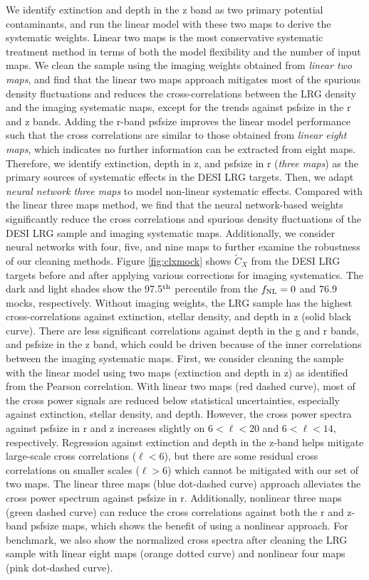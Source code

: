 We identify extinction and depth in the z band as two primary potential contaminants, and run the linear model with these two maps to derive the systematic weights. Linear two maps is the most conservative systematic treatment method in terms of both the model flexibility and the number of input maps. We clean the sample using the imaging weights obtained from \textit{linear two maps}, and find that the linear two maps approach mitigates most of the spurious density fluctuations and reduces the cross-correlations between the LRG density and the imaging systematic maps, except for the trends against psfsize in the r and z bands. Adding the r-band psfsize improves the linear model performance such that the cross correlations are similar to those obtained from \textit{linear eight maps}, which indicates no further information can be extracted from eight maps. Therefore, we identify extinction, depth in z, and psfsize in r (\textit{three maps}) as the primary sources of systematic effects in the DESI LRG targets. Then, we adapt \textit{neural network three maps} to model non-linear systematic effects. Compared with the linear three maps method, we find that the neural network-based weights significantly reduce the cross correlations and spurious density fluctuations of the DESI LRG sample and imaging systematic maps. Additionally, we consider neural networks with four, five, and nine maps to further examine the robustness of our cleaning methods. Figure \ref{fig:clxmock} shows $\tilde{C}_{X}$ from the DESI LRG targets before and after applying various corrections for imaging systematics. The dark and light shades show the 97.5$^{\rm th}$ percentile from the $f_{\rm NL}=0$ and $76.9$ mocks, respectively. Without imaging weights, the LRG sample has the highest cross-correlations against extinction, stellar density, and depth in z (solid black curve). There are less significant correlations against depth in the g and r bands, and psfsize in the z band, which could be driven because of the inner correlations between the imaging systematic maps. First, we consider cleaning the sample with the linear model using two maps (extinction and depth in z) as identified from the Pearson correlation. With linear two maps (red dashed curve), most of the cross power signals are reduced below statistical uncertainties, especially against extinction, stellar density, and depth. However, the cross power spectra against psfsize in r and z increases slightly on $6<\ell<20$ and $6<\ell<14$, respectively. Regression against extinction and depth in the z-band helps mitigate large-scale cross correlations ($\ell < 6$), but there are some residual cross correlations on smaller scales ($\ell > 6$) which cannot be mitigated with our set of two maps. The linear three maps (blue dot-dashed curve) approach alleviates the cross power spectrum against psfsize in r. Additionally, nonlinear three maps (green dashed curve) can reduce the cross correlations against both the r and z-band psfsize maps, which shows the benefit of using a nonlinear approach. For benchmark, we also show the normalized cross spectra after cleaning the LRG sample with linear eight maps (orange dotted curve) and nonlinear four maps (pink dot-dashed curve). 

